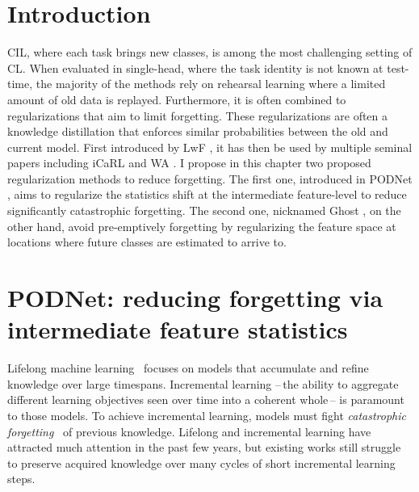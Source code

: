 
\section{Introduction}

\ac{CIL}, where each task brings new classes, is among the most challenging setting of \ac{CL}. When
evaluated in single-head, where the task identity is not known at test-time, the majority of the
methods rely on rehearsal learning where a limited amount of old data is replayed. Furthermore, it
is often combined to regularizations that aim to limit forgetting. These regularizations are often a
knowledge distillation \citep{hinton2015knowledge_distillation} that enforces similar probabilities
between the old and current model. First introduced by LwF \citep{li2018lwf}, it has then be used by
multiple seminal papers including iCaRL \citep{rebuffi2017icarl} and WA
\citep{zhao2020weightalignement}. I propose in this chapter two proposed regularization methods to
reduce forgetting. The first one, introduced in \ac{PODNet} \citep{douillard2020podnet}, aims to
regularize the statistics shift at the intermediate feature-level to reduce significantly
catastrophic forgetting. The second one, nicknamed Ghost \citep{douillard2020ghost}, on the other
hand, avoid pre-emptively forgetting by regularizing the feature space at locations where future
classes are estimated to arrive to.

\section{PODNet: reducing forgetting via intermediate feature statistics}

Lifelong machine
learning~\citep{robins1995catastrophicforgetting,french1999catastrophicforgetting,thrun1998lifelonglearning}
focuses on models that accumulate and refine knowledge over large timespans. Incremental learning
--\,the ability to aggregate different learning objectives seen over time into a coherent whole\,--
is paramount to those models. To achieve incremental learning, models must fight
\textit{catastrophic
    forgetting}~\citep{robins1995catastrophicforgetting,french1999catastrophicforgetting} of previous
knowledge. Lifelong and incremental learning have attracted much attention in the past few years,
but existing works still struggle to preserve acquired knowledge over many cycles of short
incremental learning steps.

